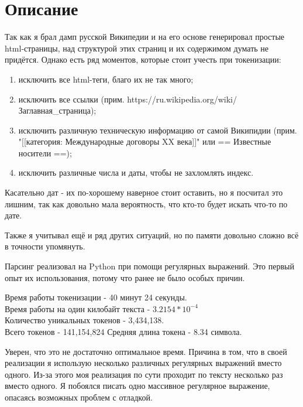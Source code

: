 \section{Описание}

Так как я брал дамп русской Википедии и на его основе генерировал простые html-страницы, над структурой этих страниц и их содержимом думать не придётся. Однако есть ряд моментов, которые стоит учесть при токенизации:

\begin{enumerate}
    \item исключить все html-теги, благо их не так много;
    \item исключить все ссылки (прим. https://ru.wikipedia.org/wiki/Заглавная\_страница);
    \item исключить различную техническую информацию от самой Википидии (прим. "[[категория: Международные договоры XX века]]" или == Известные носители ==);
    \item исключить различные числа и даты, чтобы не захломлять индекс.
\end{enumerate}

Касательно дат - их по-хорошему наверное стоит оставить, но я посчитал это лишним, так как довольно мала вероятность, что кто-то будет искать что-то по дате. 

Также я учитывал ещё и ряд других ситуаций, но по памяти довольно сложно всё в точности упомянуть.

Парсинг реализовал на Python при помощи регулярных выражений. Это первый опыт их использования, потому что ранее не было особых причин.

Время работы токенизации - 40 минут 24 секунды.\\
Время работы на один килобайт текста - $3.2154 * 10^{-4}$ \\
Количество уникальных токенов - 3,434,138.\\
Всего токенов - 141,154,824
Средняя длина токена - 8.34 символа.

Уверен, что это не достаточно оптимальное время. Причина в том, что в своей реализации я использую несколько различных регулярных выражений вместо одного. Из-за этого моя реализация по сути проходит по тексту несколько раз вместо одного. Я побоялся писать одно массивное регулярное выражение, опасаясь возможных проблем с отладкой.

\pagebreak

